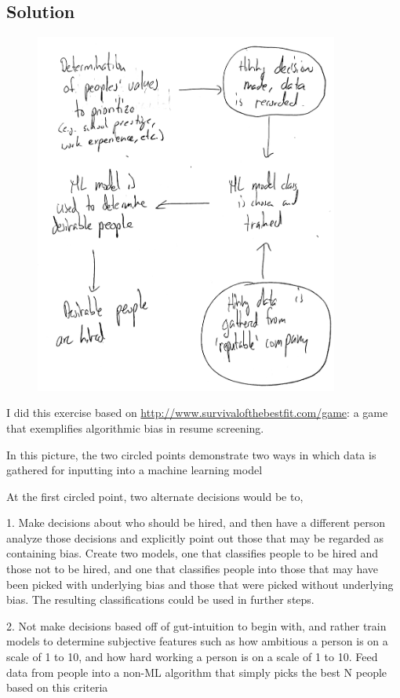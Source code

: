 \documentclass[submit]{harvardml}
\begin{document}
\subsection*{Solution}
\begin{figure}[h]
\begin{center}
\includegraphics[width=10cm]{Casualchain}
\end{center}
\end{figure}

I did this exercise based on \url{http://www.survivalofthebestfit.com/game}: a game that 
exemplifies algorithmic bias in resume screening.

In this picture, the two circled points demonstrate two ways 
in which data is gathered for inputting into a machine learning model 


At the first circled point, two alternate decisions would be to,

1. Make decisions about who should be hired, and then have a different
person analyze those decisions and explicitly point out those that may 
be regarded as containing bias. Create two models, one that classifies
people to be hired and those not to be hired, and one that 
classifies people into those that may have been picked with underlying
bias and those that were picked without underlying bias. The
resulting classifications could be used in further steps.

2. Not make decisions based off of gut-intuition to begin with, and rather
train models to determine subjective features such as 
how ambitious a person is on a scale of 1 to 10, and how hard working
a person is on a scale of 1 to 10. Feed data from people into a non-ML algorithm
that simply picks the best N people based on this criteria
\end{document}
